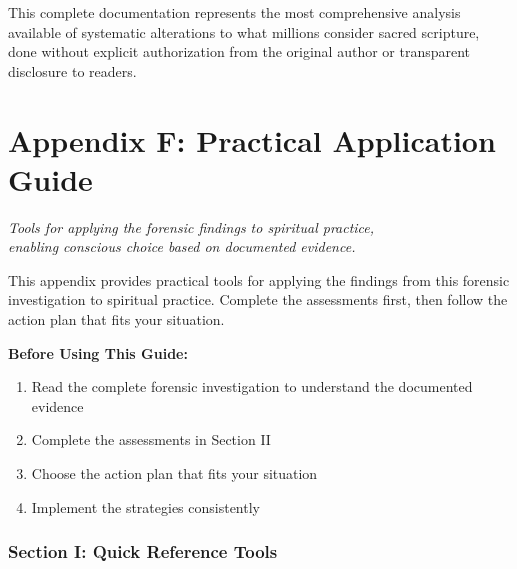\documentclass[11pt,twoside]{book}
\begin{document}
This complete documentation represents the most comprehensive analysis available of systematic alterations to what millions consider sacred scripture, done without explicit authorization from the original author or transparent disclosure to readers.
\part*{Appendix F: Practical Application Guide}
\label{sec:org8691333}
\thispagestyle{plain}

{\centering\itshape Tools for applying the forensic findings to spiritual practice,\\enabling conscious choice based on documented evidence.\par}
\vspace{0.3cm}

\normalfont\justifying
This appendix provides practical tools for applying the findings from this forensic investigation to spiritual practice. Complete the assessments first, then follow the action plan that fits your situation.

\textbf{\textbf{Before Using This Guide:}}
\begin{enumerate}
\item Read the complete forensic investigation to understand the documented evidence
\item Complete the assessments in Section II
\item Choose the action plan that fits your situation
\item Implement the strategies consistently
\end{enumerate}
\section*{Section I: Quick Reference Tools}
\label{sec:orga37f2e6}
\end{document}

